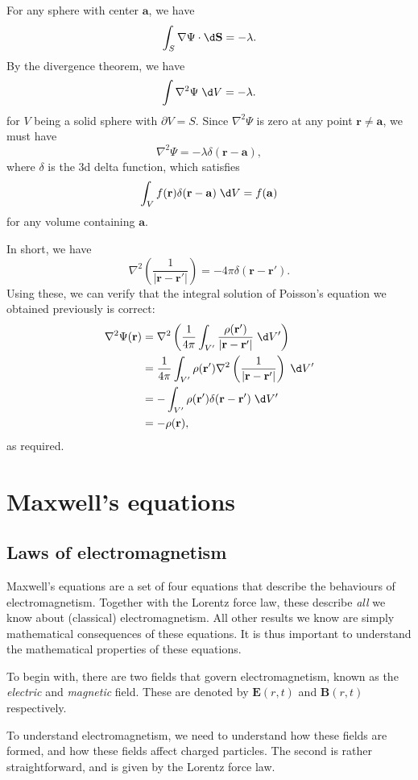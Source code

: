 \documentclass[a4paper]{article}
\begin{document}
For any sphere with center $\mathbf{a}$, we have
\[
  \int_S \nabla \Psi\cdot \d \mathbf{S} = -\lambda.
\]
By the divergence theorem, we have
\[
  \int \nabla^2\Psi \;\d V = -\lambda.
\]
for $V$ being a solid sphere with $\partial V = S$. Since $\nabla^2\Psi$ is zero at any point $\mathbf{r} \not = \mathbf{a}$, we must have
\[
  \nabla^2\Psi = -\lambda \delta(\mathbf{r} - \mathbf{a}),
\]
where $\delta$ is the 3d delta function, which satisfies
\[
  \int_V f(\mathbf{r}) \delta (\mathbf{r} - \mathbf{a})\;\d V = f(\mathbf{a})
\]
for any volume containing $\mathbf{a}$.

In short, we have
\[
  \nabla^2\left(\frac{1}{|\mathbf{r} - \mathbf{r}'|}\right) = -4\pi\delta(\mathbf{r} - \mathbf{r}').
\]
Using these, we can verify that the integral solution of Poisson's equation we obtained previously is correct:
\begin{align*}
  \nabla^2 \Psi(\mathbf{r}) &= \nabla^2\left(\frac{1}{4\pi}\int_{V'}\frac{\rho(\mathbf{r}')}{|\mathbf{r} - \mathbf{r}'|}\;\d V'\right)\\
  &= \frac{1}{4\pi}\int_{V'} \rho(\mathbf{r}')\nabla^2\left(\frac{1}{|\mathbf{r} - \mathbf{r}'|}\right)\;\d V'\\
  &= -\int_{V'} \rho(\mathbf{r}') \delta(\mathbf{r} - \mathbf{r}')\;\d V'\\
  &= -\rho (\mathbf{r}),
\end{align*}
as required.
\section{Maxwell's equations}
\subsection{Laws of electromagnetism}
Maxwell's equations are a set of four equations that describe the behaviours of electromagnetism. Together with the Lorentz force law, these describe \emph{all} we know about (classical) electromagnetism. All other results we know are simply mathematical consequences of these equations. It is thus important to understand the mathematical properties of these equations.

To begin with, there are two fields that govern electromagnetism, known as the \emph{electric} and \emph{magnetic} field. These are denoted by $\mathbf{E}(r, t)$ and $\mathbf{B}(r, t)$ respectively.

To understand electromagnetism, we need to understand how these fields are formed, and how these fields affect charged particles. The second is rather straightforward, and is given by the Lorentz force law.
\end{document}
